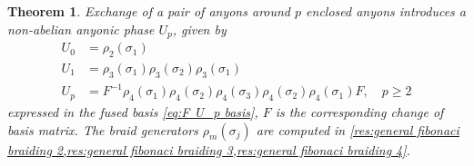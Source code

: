\documentclass[a4paper,10pt,oneside]{book}
\theoremstyle{plain}
\newtheorem{theorem}{Theorem}[section]
\theoremstyle{definition}
\theoremstyle{remark}
\begin{document}
\begin{theorem}\label{thm:fibonacci U_p}
  Exchange of a pair of anyons around $p$ enclosed anyons introduces a non-abelian anyonic phase $U_p$, given by
  \begin{align*}
    U_0 &= ρ_2(σ_1) \\
    U_1 &= ρ_3(σ_1) ρ_3(σ_2) ρ_3(σ_1) \\
    U_p &= F^{-1} ρ_4(σ_1) ρ_4(σ_2) ρ_4(σ_3) ρ_4(σ_2) ρ_4(σ_1) F, \quad p \ge 2
  \end{align*}
  expressed in the fused basis \cref{eq:F U_p basis}, $F$ is the corresponding change of basis matrix. The braid generators $ρ_m(σ_j)$ are computed in \cref{res:general fibonaci braiding 2,res:general fibonaci braiding 3,res:general fibonaci braiding 4}.

\end{theorem}
\end{document}

